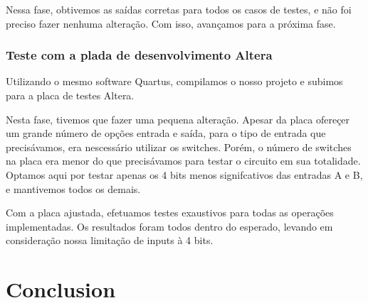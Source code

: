 \documentclass{article}
\begin{document}
Nessa fase, obtivemos as saídas corretas para todos os casos de testes, e não foi preciso fazer nenhuma alteração. Com isso, avançamos para a próxima fase.

\subsubsection{Teste com a plada de desenvolvimento Altera}

Utilizando o mesmo software Quartus, compilamos o nosso projeto e subimos para a placa de testes Altera.

Nesta fase, tivemos que fazer uma pequena alteração. Apesar da placa ofereçer um grande número de opções entrada e saída, para o tipo de entrada que precisávamos, era nescessário utilizar os switches. Porém, o número de switches na placa era menor do que precisávamos para testar o circuito em sua totalidade. Optamos aqui por testar apenas os 4 bits menos signifcativos das entradas A e B, e mantivemos todos os demais.

Com a placa ajustada, efetuamos testes exaustivos para todas as operações implementadas. Os resultados foram todos dentro do esperado, levando em consideração nossa limitação de inputs à 4 bits.

\section{Conclusion}
\lipsum[4]
\end{document}
